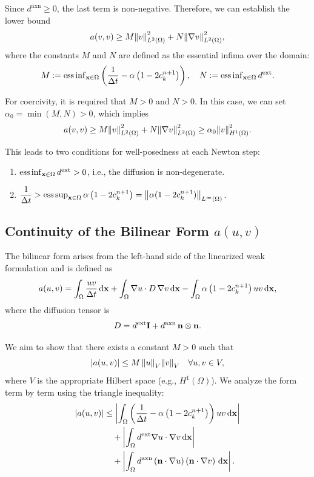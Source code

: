 \documentclass[12pt, a4paper, twoside, openright]{report}
\begin{document}
Since $d^{\mathrm{axn}} \ge 0$, the last term is non-negative. Therefore, we can establish the lower bound
\[
a(v,v) \ge M \norm{v}_{L^2(\Omega)}^2 + N \norm{\vb{\nabla} v}_{L^2(\Omega)}^2,
\]
where the constants $M$ and $N$ are defined as the essential infima over the domain:
\[
M := \operatorname{ess\,inf}_{\vb{x} \in \Omega} \left( \frac{1}{\Delta t} - \alpha \left(1 - 2c_k^{n+1}\right) \right), 
\quad 
N := \operatorname{ess\,inf}_{\vb{x} \in \Omega} d^{\mathrm{ext}}.
\]

For coercivity, it is required that $M > 0$ and $N > 0$. In this case, we can set $\alpha_0 = \min(M, N) > 0$, which implies
\[
a(v,v) \ge M \norm{v}_{L^2(\Omega)}^2 + N \norm{\vb{\nabla} v}_{L^2(\Omega)}^2 \ge \alpha_0 \norm{v}_{H^1(\Omega)}^2.
\]

This leads to two conditions for well-posedness at each Newton step:
\begin{enumerate}
  \item $\operatorname{ess\,inf}_{\vb{x} \in \Omega} d^{\mathrm{ext}} > 0$, i.e., the diffusion is non-degenerate.
  \item $\dfrac{1}{\Delta t} > \operatorname{ess\,sup}_{\vb{x} \in \Omega} \alpha \left(1 - 2 c_k^{n+1}\right) = \norm{\alpha (1 - 2 c_k^{n+1})}_{L^\infty(\Omega)}$.
\end{enumerate}


\subsection{Continuity of the Bilinear Form $a(u, v)$}

The bilinear form arises from the left-hand side of the linearized weak formulation and is defined as
\[
a(u, v) = \int_{\Omega} \frac{u v}{\Delta t} \, \dd \vb{x} + \int_{\Omega} \vb{\nabla} u \cdot D \, \vb{\nabla} v \, \dd \vb{x} - \int_{\Omega} \alpha \left(1 - 2 c_k^{n+1}\right) u v \, \dd \vb{x},
\]
where the diffusion tensor is 
\[
D = d^{\mathrm{ext}} \mathbf{I} + d^{\mathrm{axn}} \, \vb{n} \otimes \vb{n}.
\]

We aim to show that there exists a constant $M > 0$ such that
\[
\abs{a(u, v)} \le M \, \norm{u}_{V} \norm{v}_{V} \quad \forall u, v \in V,
\]
where $V$ is the appropriate Hilbert space (e.g., $H^1(\Omega)$). We analyze the form term by term using the triangle inequality:
\begin{align*}
\abs{a(u, v)} &\le 
\left| \int_{\Omega} \left( \frac{1}{\Delta t} - \alpha \left(1-2c_k^{n+1}\right) \right) u v \, \dd \vb{x} \right| \\
&\quad + \left| \int_{\Omega} d^{\mathrm{ext}} \vb{\nabla} u \cdot \vb{\nabla} v \, \dd \vb{x} \right| \\
&\quad + \left| \int_{\Omega} d^{\mathrm{axn}} \left( \vb{n} \cdot \vb{\nabla} u \right) \left( \vb{n} \cdot \vb{\nabla} v \right) \, \dd \vb{x} \right|.
\end{align*}
\end{document}
